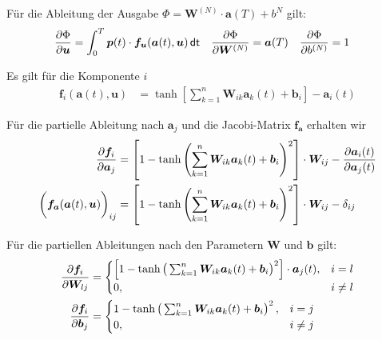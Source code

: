 \documentclass[a4paper, 12pt]{scrartcl}
\newcommand{\dt}{\thinspace \mathsf{dt}}
\begin{document}
Für die Ableitung der Ausgabe $\Phi = \bm{W}^{(N)} \cdot \bm{a}(T) + b^N$ gilt: 
%
\begin{align*}
    \frac{\partial \Phi}{\partial \bm{u}} 
    &=
    \int_{0}^{T} \bm{p}(t) \cdot \bm{f}_{\bm{u}}(\bm{a}(t), \bm{u}) \dt
    \quad
    \frac{\partial \Phi}{\partial \bm{W}^{(N)}}=\bm{a}(T)
    \quad
    \frac{\partial \Phi}{\partial b^{(N)}}=1
\end{align*}

Es gilt für die Komponente $i$
%
\begin{align*}
    \bm{f}_{i}(\bm{a}(t), \bm{u})
    &=
    \tanh
    \left[
        \sum_{k=1}^{n} \bm{W}_{ik} \bm{a}_k(t) + \bm{b}_{i}
    \right]
    -
    \bm{a}_i(t)
\end{align*}

Für die partielle Ableitung nach $\bm{a}_j$ und die Jacobi-Matrix $\bm{f}_{\bm{a}}$ erhalten wir
%
\begin{align*}
    \frac{\partial \bm{f}_i}{\partial \bm{a}_j}
    &=
    \left[
        1 - 
        \tanh
        \left(
            \sum_{k=1}^{n} \bm{W}_{ik} \bm{a}_k(t) + \bm{b}_{i}
        \right)^2
    \right] 
    \cdot
    \bm{W}_{ij} 
    -  
    \frac{\partial \bm{a}_i (t)}{\partial \bm{a}_j (t)}
    \\
    \left(
        \vphantom{\int}
        \bm{f}_{\bm{a}}(\bm{a}(t), \bm{u})
    \right)_{ij}
    &=
    \left[
        1 - 
        \tanh
        \left(
            \sum_{k=1}^{n} \bm{W}_{ik} \bm{a}_k(t) + \bm{b}_{i}
        \right)^2
    \right] 
    \cdot
    \bm{W}_{ij}
    - \delta_{ij}
\end{align*}

Für die partiellen Ableitungen nach den Parametern $\bm{W}$ und $\bm{b}$ gilt:
%
\begin{align*}
    \frac{\partial \bm{f}_i}{\partial \bm{W}_{lj}} 
    &=
    \begin{cases}
        \left[
            1 - 
            \tanh
            \left(
                \vphantom{\int}
                \sum_{k=1}^{n} \bm{W}_{ik} \bm{a}_k(t) + \bm{b}_{i}
            \right)^2
        \right] \cdot \bm{a}_j(t) , & i = l \\
        0, & i \neq l
    \end{cases}
    \\
    \frac{\partial \bm{f}_i}{\partial \bm{b}_{j}} 
    &=
    \begin{cases}
        1 - 
        \tanh
        \left(
            \vphantom{\int}
            \sum_{k=1}^{n} \bm{W}_{ik} \bm{a}_k(t) + \bm{b}_{i}
        \right)^2 , & i = j \\
        0, & i \neq j
    \end{cases}
\end{align*}
\end{document}
